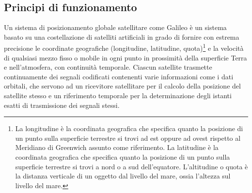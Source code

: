 \subsection{Principi di funzionamento}
Un sistema di posizionamento globale satellitare come Galileo è un sistema basato su una costellazione di satelliti artificiali in grado di fornire con estrema precisione le coordinate geografiche (longitudine, latitudine, quota)\footnote{La longitudine è la coordinata geografica che specifica quanto la posizione di un punto sulla superficie terrestre si trovi ad est oppure ad ovest rispetto al Meridiano di Greenwich assunto come riferimento. La latitudine è la coordinata geografica che specifica quanto la posizione di un punto sulla superficie terrestre si trovi a nord o a sud dell’equatore. L’altitudine o quota è la distanza verticale di un oggetto dal livello del mare, ossia l’altezza sul livello del mare.} e la velocità di qualsiasi mezzo fisso o mobile in ogni punto in prossimità della superficie Terra e nell'atmosfera, con continuità temporale. Ciascun satellite trasmette continuamente dei segnali codificati contenenti varie informazioni come i dati orbitali, che servono ad un ricevitore satellitare per il calcolo della posizione del satellite stesso e un riferimento temporale per la determinazione degli istanti esatti di trasmissione dei segnali stessi.

